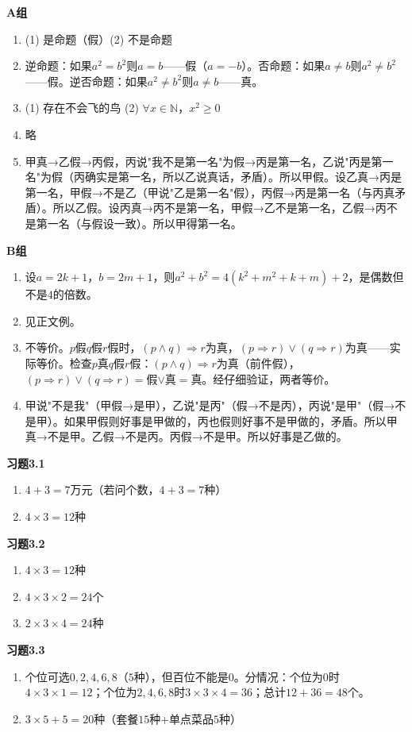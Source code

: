\textbf{A组}
\begin{enumerate}
\item (1) 是命题（假）\qquad (2) 不是命题
\item 逆命题：如果$a^2=b^2$则$a=b$——假（$a=-b$）。否命题：如果$a\neq b$则$a^2\neq b^2$——假。逆否命题：如果$a^2\neq b^2$则$a\neq b$——真。
\item (1) 存在不会飞的鸟 \qquad (2) $\forall x\in\mathbb N$，$x^2\ge0$
\item 略
\item 甲真→乙假→丙假，丙说"我不是第一名"为假→丙是第一名，乙说"丙是第一名"为假（丙确实是第一名，所以乙说真话，矛盾）。所以甲假。设乙真→丙是第一名，甲假→不是乙（甲说"乙是第一名"假），丙假→丙是第一名（与丙真矛盾）。所以乙假。设丙真→丙不是第一名，甲假→乙不是第一名，乙假→丙不是第一名（与假设一致）。所以甲得第一名。
\end{enumerate}

\textbf{B组}
\begin{enumerate}
\item 设$a=2k+1$，$b=2m+1$，则$a^2+b^2=4(k^2+m^2+k+m)+2$，是偶数但不是$4$的倍数。
\item 见正文例。
\item 不等价。$p$假$q$假$r$假时，$(p\land q)\Rightarrow r$为真，$(p\Rightarrow r)\lor(q\Rightarrow r)$为真——实际等价。检查$p$真$q$假$r$假：$(p\land q)\Rightarrow r$为真（前件假），$(p\Rightarrow r)\lor(q\Rightarrow r) = $假$\lor$真$=$真。经仔细验证，两者等价。
\item 甲说"不是我"（甲假→是甲），乙说"是丙"（假→不是丙），丙说"是甲"（假→不是甲）。如果甲假则好事是甲做的，丙也假则好事不是甲做的，矛盾。所以甲真→不是甲。乙假→不是丙。丙假→不是甲。所以好事是乙做的。
\end{enumerate}


\textbf{习题3.1}
\begin{enumerate}
\item $4+3=7$万元（若问个数，$4+3=7$种）
\item $4\times3=12$种
\end{enumerate}

\textbf{习题3.2}
\begin{enumerate}
\item $4\times3=12$种
\item $4\times3\times2=24$个
\item $2\times3\times4=24$种
\end{enumerate}

\textbf{习题3.3}
\begin{enumerate}
\item 个位可选$0,2,4,6,8$（$5$种），但百位不能是$0$。分情况：个位为$0$时$4\times3\times1=12$；个位为$2,4,6,8$时$3\times3\times4=36$；总计$12+36=48$个。
\item $3\times5+5=20$种（套餐$15$种+单点菜品$5$种）
\end{enumerate}

